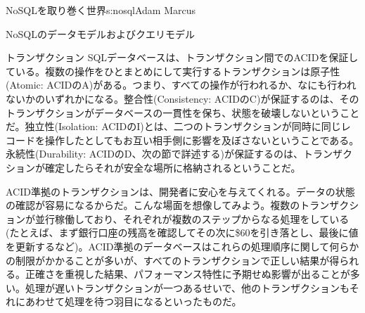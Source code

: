 \begin{aosachapter}{NoSQLを取り巻く世界}{s:nosql}{Adam Marcus}
\begin{aosasect1}{NoSQLのデータモデルおよびクエリモデル}
\begin{aosasect2}{トランザクション}
SQLデータベースは、トランザクション間でのACIDを保証している。複数の操作をひとまとめにして実行するトランザクションは原子性(Atomic: ACIDのA)がある。つまり、すべての操作が行われるか、なにも行われないかのいずれかになる。整合性(Consistency: ACIDのC)が保証するのは、そのトランザクションがデータベースの一貫性を保ち、状態を破壊しないということだ。独立性(Isolation: ACIDのI)とは、二つのトランザクションが同時に同じレコードを操作したとしてもお互い相手側に影響を及ぼさないということである。永続性(Durability: ACIDのD、次の節で詳述する)が保証するのは、トランザクションが確定したらそれが安全な場所に格納されるということだ。

ACID準拠のトランザクションは、開発者に安心を与えてくれる。データの状態の確認が容易になるからだ。こんな場面を想像してみよう。複数のトランザクションが並行稼働しており、それぞれが複数のステップからなる処理をしている(たとえば、まず銀行口座の残高を確認してその次に\$60を引き落とし、最後に値を更新するなど)。ACID準拠のデータベースはこれらの処理順序に関して何らかの制限がかかることが多いが、すべてのトランザクションで正しい結果が得られる。正確さを重視した結果、パフォーマンス特性に予期せぬ影響が出ることが多い。処理が遅いトランザクションが一つあるせいで、他のトランザクションもそれにあわせて処理を待つ羽目になるといったものだ。


\end{aosasect2}
\end{aosasect1}
\end{aosachapter}
